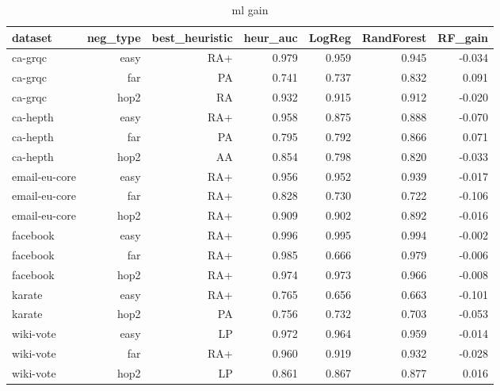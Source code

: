 \begin{table}[t]
\centering
\caption{ml gain}
\label{tab:ml_gain}
\begin{tabular}{lrrrrrr}
\hline
dataset & neg\_type & best\_heuristic & heur\_auc & LogReg & RandForest & RF\_gain \\
\hline
ca-grqc & easy & RA+ & 0.979 & 0.959 & 0.945 & -0.034 \\
ca-grqc & far & PA & 0.741 & 0.737 & 0.832 & 0.091 \\
ca-grqc & hop2 & RA & 0.932 & 0.915 & 0.912 & -0.020 \\
ca-hepth & easy & RA+ & 0.958 & 0.875 & 0.888 & -0.070 \\
ca-hepth & far & PA & 0.795 & 0.792 & 0.866 & 0.071 \\
ca-hepth & hop2 & AA & 0.854 & 0.798 & 0.820 & -0.033 \\
email-eu-core & easy & RA+ & 0.956 & 0.952 & 0.939 & -0.017 \\
email-eu-core & far & RA+ & 0.828 & 0.730 & 0.722 & -0.106 \\
email-eu-core & hop2 & RA+ & 0.909 & 0.902 & 0.892 & -0.016 \\
facebook & easy & RA+ & 0.996 & 0.995 & 0.994 & -0.002 \\
facebook & far & RA+ & 0.985 & 0.666 & 0.979 & -0.006 \\
facebook & hop2 & RA+ & 0.974 & 0.973 & 0.966 & -0.008 \\
karate & easy & RA+ & 0.765 & 0.656 & 0.663 & -0.101 \\
karate & hop2 & PA & 0.756 & 0.732 & 0.703 & -0.053 \\
wiki-vote & easy & LP & 0.972 & 0.964 & 0.959 & -0.014 \\
wiki-vote & far & RA+ & 0.960 & 0.919 & 0.932 & -0.028 \\
wiki-vote & hop2 & LP & 0.861 & 0.867 & 0.877 & 0.016 \\
\hline
\end{tabular}
\end{table}